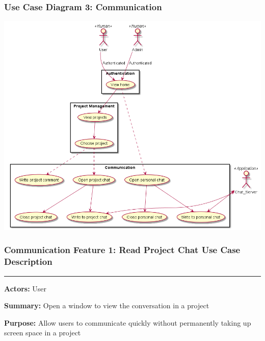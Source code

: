 \documentclass[twoside,letterpaper]{article}
\begin{document}
\newpage

\subsubsection[Use Case Diagram 3: Communication]{\rmfamily\bfseries\color{black}
	Use Case Diagram 3: Communication}

\includegraphics[width=\textwidth]{images/UseCaseDiagrams/Communication}

\newpage

\subsubsection[Communication Feature 1: Read Project Chat Use Case Description]{\rmfamily\bfseries\color{black}
	Communication Feature 1: Read Project Chat Use Case Description}
\hypertarget{RefHeading22059017292}{}

\vspace{2pt}
\hrule
\vspace{8pt}
\textbf{Actors:} User \newline

\noindent\textbf{Summary:} Open a window to view the conversation in a project  \newline

\noindent\textbf{Purpose:} Allow users to communicate quickly without permanently taking up screen space in a project \newline
\end{document}
